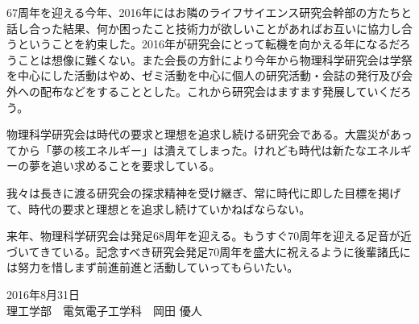 \documentclass[10pt,b5paper,papersize]{jsbook}
\begin{document}
67周年を迎える今年、2016年にはお隣のライフサイエンス研究会幹部の方たちと話し合った結果、何か困ったこと技術力が欲しいことがあればお互いに協力し合うということを約束した。2016年が研究会にとって転機を向かえる年になるだろうことは想像に難くない。また会長の方針により今年から物理科学研究会は学祭を中心にした活動はやめ、ゼミ活動を中心に個人の研究活動・会誌の発行及び会外への配布などをすることとした。これから研究会はますます発展していくだろう。\par
物理科学研究会は時代の要求と理想を追求し続ける研究会である。大震災があってから「夢の核エネルギー」は潰えてしまった。けれども時代は新たなエネルギーの夢を追い求めることを要求している。\par
我々は長きに渡る研究会の探求精神を受け継ぎ、常に時代に即した目標を掲げて、時代の要求と理想とを追求し続けていかねばならない。\par
来年、物理科学研究会は発足68周年を迎える。もうすぐ70周年を迎える足音が近づいてきている。記念すべき研究会発足70周年を盛大に祝えるように後輩諸氏には努力を惜しまず前進前進と活動していってもらいたい。\par
\begin{flushright}
  \large 2016年8月31日\\
  \large 理工学部　電気電子工学科　岡田 優人
\end{flushright}
\end{document}
